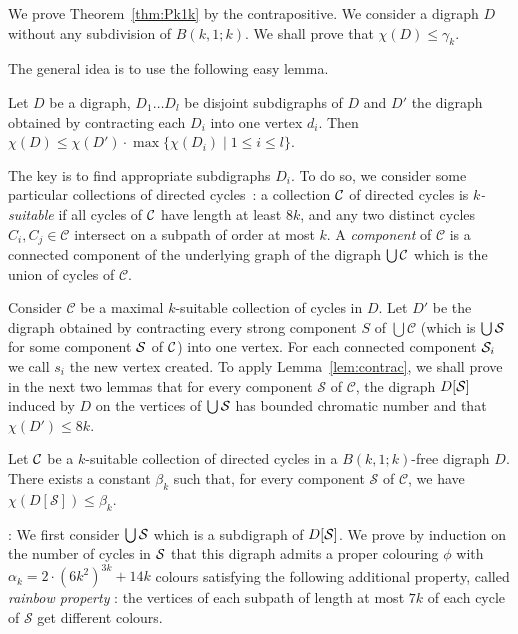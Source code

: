 \documentclass{endm}
\begin{document}
We prove Theorem~\ref{thm:Pk1k} by the contrapositive.
We consider a  digraph $D$ without any subdivision of $B(k,1;k)$. We shall prove that $\chi(D)\leq \gamma_k$.


The general idea is to use the following easy lemma.
\begin{lemma}\label{lem:contrac}
Let $D$ be a digraph, $D_1 \dots D_l$ be disjoint subdigraphs of $D$ and $D'$ the digraph obtained by contracting each $D_i$ into
one vertex $d_i$. Then $\chi(D) \leq \chi(D')\cdot \max\{\chi(D_i) \mid 1\leq i \leq l\}$.
\end{lemma}

The key is to find appropriate subdigraphs $D_i$.
To do so, we consider some particular collections of directed cycles~:
a collection ${\cal C}$ of directed cycles is {\it $k$-suitable} if 
all cycles of ${\cal C}$ have length at least $8k$, and
any two distinct cycles $C_i,C_j\in\mathcal C$ intersect on  a subpath of order at most $k$.
A \textit{component} of $\mathcal{C}$ is a connected component of the underlying graph of the digraph $\bigcup {\cal C}$ which is the union of
cycles of $\mathcal{C}$.		

Consider $\mathcal{C}$ be a maximal $k$-suitable collection of cycles in $D$. Let $D'$ be the digraph obtained by contracting 
every strong component $S$ of $\bigcup \mathcal{C}$ (which is $\bigcup {\cal S}$ for some component ${\cal S}$ of ${\cal C}$) into one vertex. For each connected component ${\cal S}_i$ we call $s_i$ the
new vertex created. To apply Lemma~\ref{lem:contrac}, we shall prove in the next two lemmas that for every component $\mathcal{S}$ of $\mathcal{C}$, the digraph $D[{\cal S}]$ induced by $D$ on the vertices
of $\bigcup {\cal S}$ has bounded chromatic number and that $\chi(D')\leq 8k$.

\begin{lemma}\label{lem:DC}
Let ${\cal C}$ be a $k$-suitable collection of directed cycles in a $B(k,1;k)$-free digraph $D$.
There exists a constant $\beta_k$ such that, for every component $\mathcal{S}$ of $\mathcal{C}$, 
we have $\chi(D[\mathcal{S}]) \leq \beta_k$.
\end{lemma} 
:
We first consider $\bigcup{\cal S}$ which is a subdigraph of $D[{\cal S}]$.  We prove by induction on the number of cycles in ${\cal S}$ that this digraph admits a proper colouring $\phi$ with $\alpha_k=2\cdot (6k^2)^{3k} + 14k$ colours satisfying the following additional property, called {\it rainbow property} : the vertices of each subpath of length at most $7k$ of each cycle of $\mathcal{S}$ get different colours.
\end{document}
